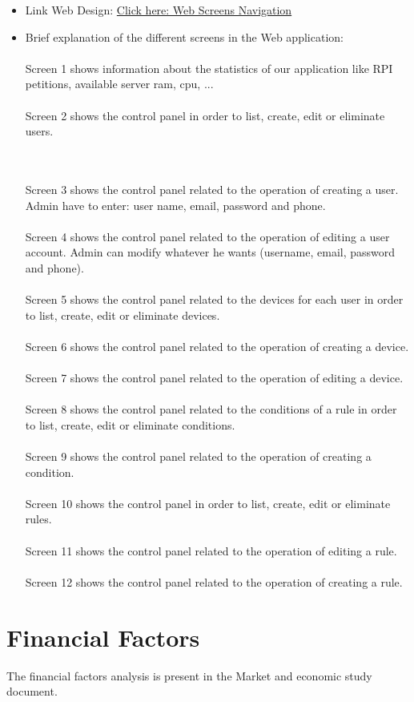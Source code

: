 \documentclass[11pt,a4paper]{article}
\begin{document}
\begin{itemize}
\item Link Web Design:\newline\newline
 \textcolor{blue}{\href{https://drive.google.com/file/d/1_nxHsY7jSMUKHQmlxoCyGm_XgQ5xAlk8/view?usp=sharing}{Click here: Web Screens Navigation}}
 \item Brief explanation of the different screens in the Web application: 
\\ \\
Screen 1 shows information about the statistics of our application like RPI petitions, available server ram, cpu, ...
\\ \\
Screen 2 shows the control panel in order to list, create, edit or eliminate users.

\\ \\
Screen 3 shows the control panel related to the operation of creating a user. Admin have to enter: user name, email, password and phone.
\\ \\
Screen 4 shows the control panel related to the operation of editing a user account. Admin can modify whatever he wants (username, email, password and phone). 
\\ \\
Screen 5 shows the control panel related to the devices for each user in order to list, create, edit or eliminate devices. 
\\ \\
Screen 6 shows the control panel related to the operation of creating a device.
\\ \\
Screen 7 shows the control panel related to the operation of editing a device.
\\ \\
Screen 8 shows the control panel related to the conditions of a rule in order to list, create, edit or eliminate conditions.
\\ \\
Screen 9 shows the control panel related to the operation of creating a condition.
\\ \\
Screen 10 shows the control panel in order to list, create, edit or eliminate rules.
\\ \\
Screen 11 shows the control panel related to the operation of editing a rule.
\\ \\
Screen 12 shows the control panel related to the operation of creating a rule.

\end{itemize}
\section{Financial Factors}
The financial factors analysis is present in the Market and economic study document.
\end{document}
